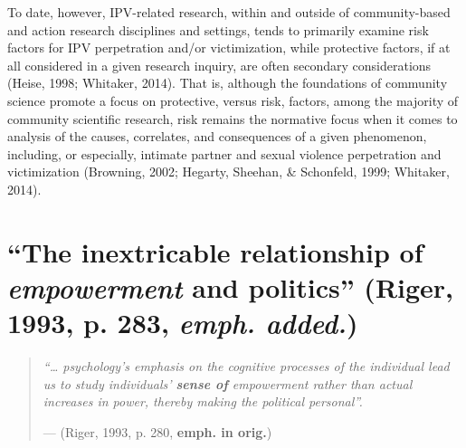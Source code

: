\documentclass[11pt,]{tufte-book}
\begin{document}
To date, however, IPV-related research, within and outside of
community-based and action research disciplines and settings, tends to
primarily examine risk factors for IPV perpetration and/or
victimization, while protective factors, if at all considered in a given
research inquiry, are often secondary considerations (Heise, 1998;
Whitaker, 2014). That is, although the foundations of community science
promote a focus on protective, versus risk, factors, among the majority
of community scientific research, risk remains the normative focus when
it comes to analysis of the causes, correlates, and consequences of a
given phenomenon, including, or especially, intimate partner and sexual
violence perpetration and victimization (Browning, 2002; Hegarty,
Sheehan, \& Schonfeld, 1999; Whitaker, 2014).

\section{\texorpdfstring{``The inextricable relationship of
\emph{empowerment} and politics'' (Riger, 1993, p. 283, \emph{emph.
added.})}{The inextricable relationship of empowerment and politics , p.~283, emph. added.(Riger, 1993, p. 283, emph. added.)}}\label{the-inextricable-relationship-of-empowerment-and-politics-p.283-emph.-added.riger1993what-p.-283-_emph.-added._}

\begin{quote}
\emph{``\ldots{} psychology's emphasis on the cognitive processes of the
individual lead us to study individuals' \textbf{sense of} empowerment
rather than actual increases in power, thereby making the political
personal''.}

\hfill --- (Riger, 1993, p. 280, \textbf{emph. in orig.})
\end{quote}
\end{document}

